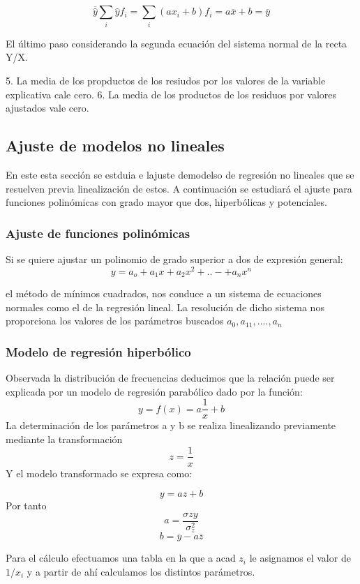 \documentclass{article}
\begin{document}
$$ \overline{\hat{y}} \sum_i \hat{y} f_i = \sum_i (ax_i +b)f_i = a\overline{x} +b = \overline{y} $$

El último paso considerando la segunda ecuación del sistema normal de la recta Y/X.

5. La media de los propductos de los resiudos por los valores de la variable explicativa cale cero.
6. La media de los productos de los residuos por valores ajustados vale cero.

\subsection{Ajuste de modelos no lineales}

En este esta sección se estduia e lajuste demodelso de regresión no lineales que se resuelven previa linealización de estos. A continuación se estudiará el ajuste para funciones polinómicas con grado mayor que dos, hiperbólicas y potenciales.

\subsubsection{Ajuste de funciones polinómicas}

Si se quiere ajustar un polinomio de grado superior a dos de expresión general:
$$ y = a_o + a_1x +a_2x^2 + ..- + a_nx^n $$

el método de mínimos cuadrados, nos conduce a un sistema de ecuaciones normales como el de la regresión lineal. La resolución de dicho sistema nos proporciona los valores de los parámetros buscados $a_0, a_11, .... , a_n$
\subsubsection{Modelo de regresión hiperbólico}

Observada la distribución de frecuencias deducimos que la relación puede ser explicada por un modelo de regresión parabólico dado por la función:
$$ y= f(x) = a\frac{1}{x} + b $$
La determinación de los parámetros a y b se realiza linealizando previamente mediante la transformación 
$$ z = \frac{1}{x} $$
Y el modelo transformado se expresa como:

$$ y = az +b $$
Por tanto $$ a = \frac{\sigma{zy} }{\sigma_{z}^2} $$ 
$$ b = \overline{y} - a \overline{z} $$

Para el cálculo efectuamos una tabla en la que a acad $z_i$ le asignamos el valor de $1/x_i$ y a partir de ahí calculamos los distintos parámetros.
\end{document}
